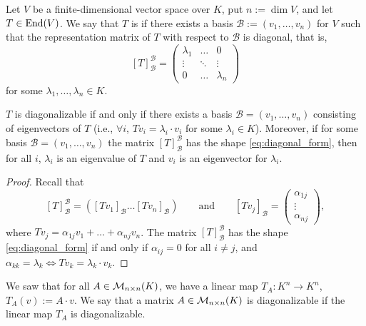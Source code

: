 \begin{definition}\label{def:diagonalizable_endomorphism}
  Let $V$ be a finite-di\-men\-sional vector space over $K$, put $n := \dim V$, and let $T \in \operatorname{End}(V)$. We say that $T$ is  if there exists a basis $\mathcal{B} := (v_1, \dots, v_n)$ for $V$ such that the representation matrix of $T$ with respect to $\mathcal{B}$ is diagonal, that is,
  \begin{equation} \label{eq:diagonal_form}
    [T]_{\mathcal{B}}^{\mathcal{B}} = \begin{pmatrix} \lambda_1 & \dots & 0 \\ \vdots & \ddots & \vdots \\ 0 & \dots & \lambda_n \end{pmatrix}
  \end{equation}
  for some $\lambda_1, \dots, \lambda_n \in K$.
\end{definition}

\begin{lemma}\label{lem:diagonalizable_matrix_criterion}
  $T$ is diagonalizable if and only if there exists a basis $\mathcal{B}=(v_1, \dots, v_n)$ consisting of eigenvectors of $T$ (i.e., $\forall i$, $Tv_i = \lambda_i \cdot v_i$ for some $\lambda_i \in K$).
  Moreover, if for some basis $\mathcal{B}=(v_1, \dots, v_n)$ the matrix $[T]_{\mathcal{B}}^{\mathcal{B}}$ has the shape \eqref{eq:diagonal_form}, then for all $i$, $\lambda_i$ is an eigenvalue of $T$ and $v_i$ is an eigenvector for $\lambda_i$.
\end{lemma}

\begin{proof}
  Recall that
  \[
  [T]_{\mathcal{B}}^{\mathcal{B}} = \left( [Tv_1]_{\mathcal{B}} \dots [Tv_n]_{\mathcal{B}} \right) \qquad \text{and} \qquad [Tv_j]_{\mathcal{B}} = \begin{pmatrix} \alpha_{1j} \\ \vdots \\ \alpha_{nj} \end{pmatrix},
  \]
  where $Tv_j = \alpha_{1j}v_1 + \dots + \alpha_{nj}v_n$.
  The matrix $[T]_{\mathcal{B}}^{\mathcal{B}}$ has the shape \eqref{eq:diagonal_form} if and only if $\alpha_{ij} = 0$ for all $i \ne j$, and $\alpha_{kk} = \lambda_k \iff Tv_k = \lambda_k \cdot v_k$.
\end{proof}

\begin{remark}\label{rem:diagonalizable_matrix}
  We saw that for all $A \in \mathcal{M}_{n \times n}(K)$, we have a linear map $T_A: K^n \rightarrow K^n$, $T_A(v) := A \cdot v$. We say that a matrix $A \in \mathcal{M}_{n \times n}(K)$ is diagonalizable if the linear map $T_A$ is diagonalizable.
\end{remark}

